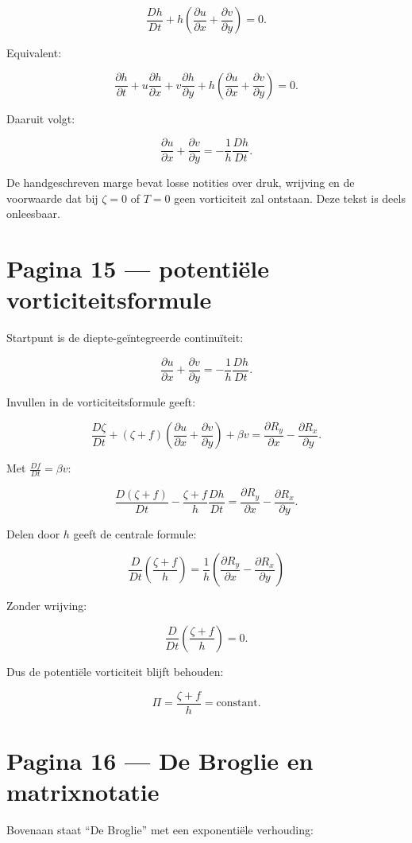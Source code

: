\documentclass[11pt,a4paper]{article}
\begin{document}
$$
\frac{Dh}{Dt}
+
h
\left(
\frac{\partial u}{\partial x}
+
\frac{\partial v}{\partial y}
\right)
=
0.
$$

Equivalent:

$$
\frac{\partial h}{\partial t}
+
u\frac{\partial h}{\partial x}
+
v\frac{\partial h}{\partial y}
+
h
\left(
\frac{\partial u}{\partial x}
+
\frac{\partial v}{\partial y}
\right)
=
0.
$$

Daaruit volgt:

$$
\frac{\partial u}{\partial x}
+
\frac{\partial v}{\partial y}
=
-\frac{1}{h}\frac{Dh}{Dt}.
$$

De handgeschreven marge bevat losse notities over druk, wrijving en de voorwaarde dat bij $\zeta=0$ of $T=0$ geen vorticiteit zal ontstaan. Deze tekst is deels onleesbaar.

\newpage

\section*{Pagina 15 --- potentiële vorticiteitsformule}
Startpunt is de diepte-geïntegreerde continuïteit:

$$
\frac{\partial u}{\partial x}
+
\frac{\partial v}{\partial y}
=
-\frac{1}{h}\frac{Dh}{Dt}.
$$

Invullen in de vorticiteitsformule geeft:

$$
\frac{D\zeta}{Dt}
+
(\zeta+f)
\left(
\frac{\partial u}{\partial x}
+
\frac{\partial v}{\partial y}
\right)
+
\beta v
=
\frac{\partial R_y}{\partial x}
-
\frac{\partial R_x}{\partial y}.
$$

Met $\frac{Df}{Dt}=\beta v$:

$$
\frac{D(\zeta+f)}{Dt}
-
\frac{\zeta+f}{h}\frac{Dh}{Dt}
=
\frac{\partial R_y}{\partial x}
-
\frac{\partial R_x}{\partial y}.
$$

Delen door $h$ geeft de centrale formule:

$$
\boxed{
\frac{D}{Dt}
\left(
\frac{\zeta+f}{h}
\right)
=
\frac{1}{h}
\left(
\frac{\partial R_y}{\partial x}
-
\frac{\partial R_x}{\partial y}
\right)
}
$$

Zonder wrijving:

$$
\frac{D}{Dt}
\left(
\frac{\zeta+f}{h}
\right)
=
0.
$$

Dus de potentiële vorticiteit blijft behouden:

$$
\Pi
=
\frac{\zeta+f}{h}
=
\text{constant}.
$$

\newpage

\section*{Pagina 16 --- De Broglie en matrixnotatie}
Bovenaan staat ``De Broglie'' met een exponentiële verhouding:
\end{document}
